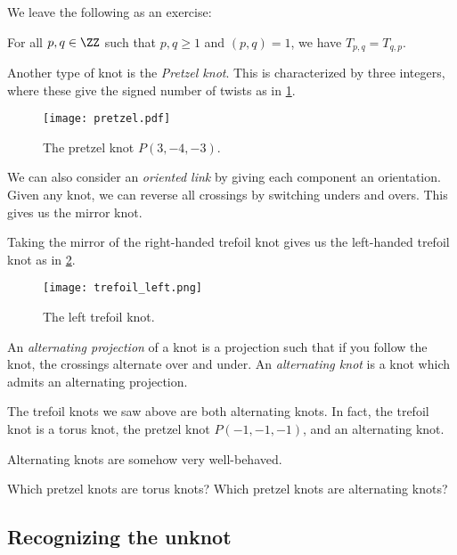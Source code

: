 \documentclass{amsproc}
\begin{document}
We leave the following as an exercise:

\begin{prop}
For all $p,q\in \ZZ$ such that $p,q \geq 1$ and $\left( p,q \right) = 1$, we have
$T_{p,q} = T_{q,p}$. 
\end{prop}

Another type of knot is the \emph{Pretzel knot}.
This is characterized by three integers, where these 
give the signed number of twists as in \cref{fig:pretzel_knot}.

\begin{figure}
\texttt{[image: pretzel.pdf]}
\caption{The pretzel knot $P\left( 3 , -4 , -3 \right)$.}
\label{fig:pretzel_knot}
\end{figure}

We can also consider an \emph{oriented link} by giving each component an orientation.
Given any knot, we can reverse all crossings by switching unders and overs.
This gives us the mirror knot.

\begin{exm}
Taking the mirror of the right-handed trefoil knot gives us the 
left-handed trefoil knot as in \cref{fig:left_trefoil}.
\begin{figure}
\texttt{[image: trefoil\_left.png]}
\caption{The left trefoil knot.}
\label{fig:left_trefoil}
\end{figure}
\end{exm}

An \emph{alternating projection} of a knot is a projection such that if you follow
the knot, the crossings alternate over and under.
An \emph{alternating knot} is a knot which admits an alternating projection.

\begin{exm}
The trefoil knots we saw above are both alternating knots.
In fact, the trefoil knot is a torus knot, 
the pretzel knot $P\left( -1 ,-1, -1 \right)$, 
and an alternating knot. 
\end{exm}

\begin{rmk}
Alternating knots are somehow very well-behaved.
\end{rmk}

\begin{exr}
Which pretzel knots are torus knots?
Which pretzel knots are alternating knots?
\end{exr}

\subsection{Recognizing the unknot}
\end{document}
